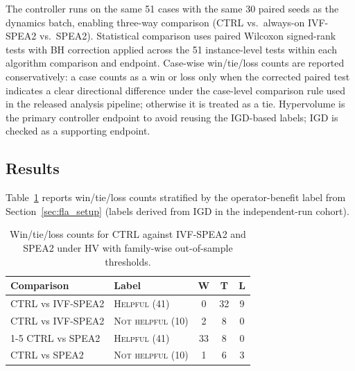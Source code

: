 \documentclass[conference]{IEEEtran}
\begin{document}
The controller runs on the same 51 cases with the same 30 paired seeds as the
dynamics batch, enabling three-way comparison (CTRL vs.\ always-on IVF-SPEA2
vs.\ SPEA2). Statistical comparison uses paired Wilcoxon signed-rank tests
with BH correction applied across the 51 instance-level tests
within each algorithm comparison and endpoint. Case-wise
win/tie/loss counts are reported
conservatively: a case counts as a win or loss only when the corrected paired
test indicates a clear directional difference under the case-level comparison
rule used in the released analysis pipeline; otherwise it is treated as a
tie. Hypervolume is the primary controller endpoint to avoid reusing the
IGD-based labels; IGD is checked as a supporting endpoint.

\subsection{Results}
\label{sec:ctrl_results}

Table~\ref{tab:ctrl_wtl} reports win/tie/loss counts stratified by the
operator-benefit label from Section~\ref{sec:fla_setup} (labels derived from
IGD in the independent-run cohort).

\begin{table}[t]
	\centering
	\caption{Win/tie/loss counts for CTRL against IVF-SPEA2 and SPEA2 under HV
		with family-wise out-of-sample thresholds.}
	\label{tab:ctrl_wtl}
	\begin{tabular}{llccc}
		\toprule
		\textbf{Comparison} & \textbf{Label}           & \textbf{W} & \textbf{T} & \textbf{L} \\
		\midrule
		CTRL vs IVF-SPEA2   & \textsc{Helpful} (41)      & 0          & 32         & 9          \\
		CTRL vs IVF-SPEA2   & \textsc{Not helpful} (10) & 2          & 8          & 0          \\
		\cmidrule(lr){1-5}
		CTRL vs SPEA2       & \textsc{Helpful} (41)      & 33         & 8          & 0          \\
		CTRL vs SPEA2       & \textsc{Not helpful} (10) & 1          & 6          & 3          \\
		\bottomrule
	\end{tabular}
\end{table}
\end{document}
